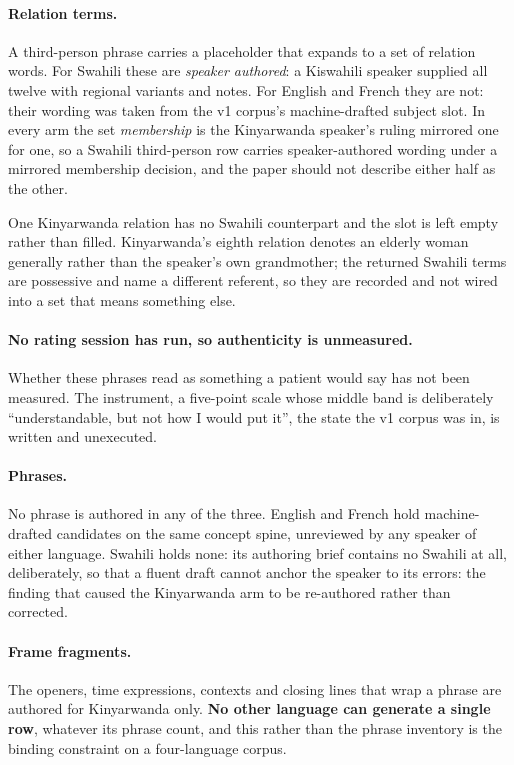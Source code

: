 \paragraph{Relation terms.} A third-person phrase carries a placeholder that
expands to a set of relation words. For Swahili these are \emph{speaker
authored}: a Kiswahili speaker supplied all twelve with regional variants and
notes. For English and French they are not: their wording was taken from the
v1 corpus's machine-drafted subject slot. In every arm the set \emph{membership}
is the Kinyarwanda speaker's ruling mirrored one for one, so a Swahili
third-person row carries speaker-authored wording under a mirrored membership
decision, and the paper should not describe either half as the other.

One Kinyarwanda relation has no Swahili counterpart and the slot is left empty
rather than filled. Kinyarwanda's eighth relation denotes an elderly woman
generally rather than the speaker's own grandmother; the returned Swahili terms
are possessive and name a different referent, so they are recorded and not
wired into a set that means something else.

\paragraph{No rating session has run, so authenticity is unmeasured.} Whether
these phrases read as something a patient would say has not been measured. The instrument, a five-point scale whose middle band is
deliberately ``understandable, but not how I would put it'', the state the v1
corpus was in, is written and unexecuted.

\paragraph{Phrases.} No phrase is authored in any of the three. English and
French hold machine-drafted candidates on the same concept spine, unreviewed by
any speaker of either language. Swahili holds none: its authoring brief contains
no Swahili at all, deliberately, so that a fluent draft cannot anchor the
speaker to its errors: the finding that caused the Kinyarwanda arm to be
re-authored rather than corrected.

\paragraph{Frame fragments.} The openers, time expressions, contexts and
closing lines that wrap a phrase are authored for Kinyarwanda only. \textbf{No
other language can generate a single row}, whatever its phrase count, and this
rather than the phrase inventory is the binding constraint on a four-language
corpus.

